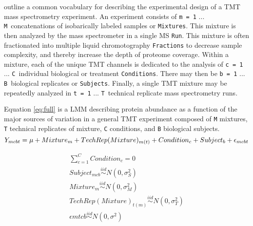 \documentclass[11pt]{elife}\usepackage[]{graphicx}\usepackage[]{color}
\begin{document}
\cite{Huang2020} outline a common vocabulary for describing the experimental
design of a TMT mass spectrometry experiment. An experiment consists of
\texttt{m = 1} ... \texttt{M}\ concatenations of isobarically labeled samples or
\texttt{Mixtures}.  This mixture is then analyzed by the mass spectrometer in a
single MS \texttt{Run}.  This mixture is often fractionated into
multiple liquid chromotography \texttt{Fractions} to decrease sample complexity,
and thereby increase the depth of proteome coverage.  Within a mixture, each of
the unique TMT channels is dedicated to the analysis of \texttt{c = 1} ...
\texttt{C}\ individual biological or treatment \texttt{Conditions}.  There may
then be \texttt{b = 1} ...  \texttt{B}\ biological replicates or
\texttt{Subjects}. Finally, a single TMT mixture may be repeatedly analyzed in
\texttt{t = 1} ... \texttt{T}\ technical replicate mass spectrometry runs.

Equation \ref{eq:full} is a LMM describing protein abundance as a function of
the major sources of variation  in a general TMT experiment composed of
\texttt{M} mixtures, \texttt{T} technical replicates of mixture, \texttt{C}
conditions, and \texttt{B} biological subjects.
\begin{equation} %
  \label{eq:full} 
	Y_{mcbt} = \mu + Mixture_m + TechRep(Mixture)_{m(t)} + Condition_c + 
	Subject_b + \epsilon_{mcbt}\\
\end{equation}

\begin{equation}
  \begin{gathered}
    \label{eq:constraints}
	\sum_{c=1}^{C} Condition_c = 0 \\
	Subject_{mcb} \stackrel{iid}{\sim} N(0,\sigma^2_S) \\
	Mixture_m \stackrel{iid}{\sim} N(0,\sigma^2_M) \\
	TechRep(Mixture)_{t(m)} \stackrel{iid}{\sim} N(0,\sigma^2_T) \\
	\epsilon{mtcb} \stackrel{iid}{\sim} N(0,\sigma^2) \\
  \end{gathered}
\end{equation}
\end{document}
